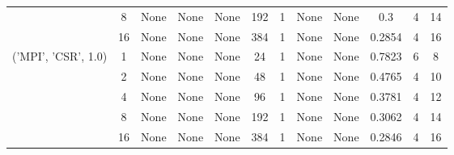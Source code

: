 \begin{tabular}{cccccccccccc}
& 8& None& None& None& 192& 1& None& None& 0.3& 4& 14\\
& 16& None& None& None& 384& 1& None& None& 0.2854& 4& 16\\
\hline
\multirow{5}{*}{('MPI', 'CSR', 1.0)}& 1& None& None& None& 24& 1& None& None& 0.7823& 6& 8\\
& 2& None& None& None& 48& 1& None& None& 0.4765& 4& 10\\
& 4& None& None& None& 96& 1& None& None& 0.3781& 4& 12\\
& 8& None& None& None& 192& 1& None& None& 0.3062& 4& 14\\
& 16& None& None& None& 384& 1& None& None& 0.2846& 4& 16\\
\hline
\end{tabular}
